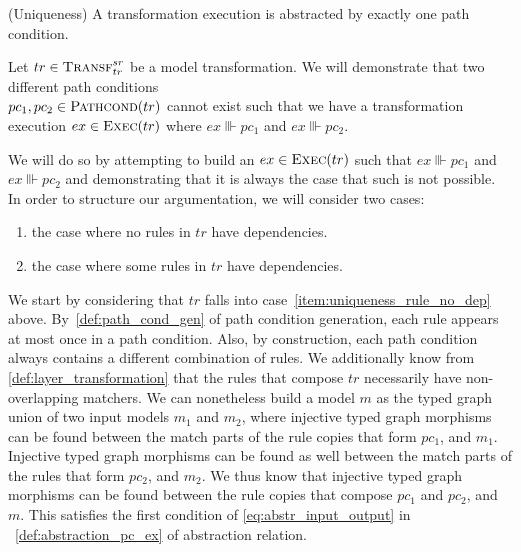 \begin{lemma} (Uniqueness) 
\label{lem:uniqueness}
A transformation execution is abstracted by exactly one path condition.
\end{lemma}
\begin{ps}
Let $tr\in \textsc{Transf}^{sr}_{tr}$ be a model transformation. We will demonstrate that two different path conditions\\$pc_1, pc_2\in \textsc{Pathcond}(tr)$ cannot exist such that we have a transformation execution $ex\in \textsc{Exec}(tr)$ where $ex\Vvdash pc_1$ and $ex\Vvdash pc_2$.

We will do so by attempting to build an $ex\in \textsc{Exec}(tr)$ such that $ex\Vvdash pc_1$ and $ex\Vvdash pc_2$ and demonstrating that it is always the case that such is not possible. In order to structure our argumentation, we will consider two cases:
\begin{enumerate}
  \item\label{item:uniqueness_rule_no_dep} the case where no rules in $tr$ have dependencies.
  \item\label{item:uniqueness_rule_has_dep} the case where some rules in $tr$ have dependencies.
\end{enumerate}

We start by considering that $tr$ falls into case~\ref{item:uniqueness_rule_no_dep} above. By~\cref{def:path_cond_gen} of path condition generation, each rule appears at most once in a path condition. Also, by construction, each path condition always contains a different combination of rules. We additionally know from \cref{def:layer_transformation} that the rules that compose $tr$ necessarily have non-overlapping matchers. We can nonetheless build a model $m$ as the typed graph union of two input models $m_1$ and $m_2$, where injective typed graph morphisms can be found between the match parts of the rule copies that form $pc_1$, and $m_1$. Injective typed graph morphisms can be found as well between the match parts of the rules that form $pc_2$, and $m_2$. We thus know that injective typed graph morphisms can be found between the rule copies that compose $pc_1$ and $pc_2$, and $m$. This satisfies the first condition of \cref{eq:abstr_input_output} in ~\cref{def:abstraction_pc_ex} of abstraction relation. 


\end{ps}
